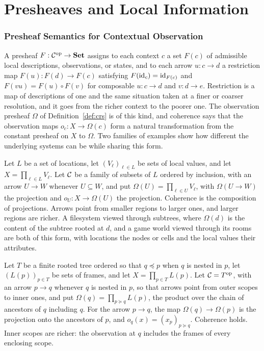 \part{Presheaves and Local Information}

\section{Presheaf Semantics for Contextual Observation}

A presheaf $F:\mathcal C^{\mathrm{op}}\to\mathbf{Set}$ assigns to each context $c$ a set $F(c)$ of admissible local descriptions, observations, or states, and to each arrow $u:c\to d$ a restriction map $F(u):F(d)\to F(c)$ satisfying $F(\mathrm{id}_c)=\mathrm{id}_{F(c)}$ and $F(vu)=F(u)\circ F(v)$ for composable $u:c\to d$ and $v:d\to e$. Restriction is a map of descriptions of one and the same situation taken at a finer or coarser resolution, and it goes from the richer context to the poorer one. The observation presheaf $\Omega$ of Definition~\ref{def:crs} is of this kind, and coherence says that the observation maps $o_c:X\to\Omega(c)$ form a natural transformation from the constant presheaf on $X$ to $\Omega$. Two families of examples show how different the underlying systems can be while sharing this form.

\begin{example}\label{ex:region}
Let $L$ be a set of locations, let $(V_\ell)_{\ell\in L}$ be sets of local values, and let $X=\prod_{\ell\in L}V_\ell$. Let $\mathcal C$ be a family of subsets of $L$ ordered by inclusion, with an arrow $U\to W$ whenever $U\subseteq W$, and put $\Omega(U)=\prod_{\ell\in U}V_\ell$, with $\Omega(U\to W)$ the projection and $o_U:X\to\Omega(U)$ the projection. Coherence is the composition of projections. Arrows point from smaller regions to larger ones, and larger regions are richer. A filesystem viewed through subtrees, where $\Omega(d)$ is the content of the subtree rooted at $d$, and a game world viewed through its rooms are both of this form, with locations the nodes or cells and the local values their attributes.
\end{example}

\begin{example}\label{ex:accum}
Let $T$ be a finite rooted tree ordered so that $q\preceq p$ when $q$ is nested in $p$, let $(L(p))_{p\in T}$ be sets of frames, and let $X=\prod_{p\in T}L(p)$. Let $\mathcal C=T^{\mathrm{op}}$, with an arrow $p\to q$ whenever $q$ is nested in $p$, so that arrows point from outer scopes to inner ones, and put $\Omega(q)=\prod_{p\succeq q}L(p)$, the product over the chain of ancestors of $q$ including $q$. For the arrow $p\to q$, the map $\Omega(q)\to\Omega(p)$ is the projection onto the ancestors of $p$, and $o_q(x)=(x_p)_{p\succeq q}$. Coherence holds. Inner scopes are richer: the observation at $q$ includes the frames of every enclosing scope.
\end{example}

